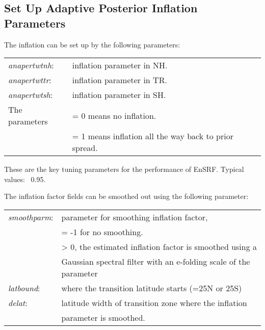 \subsection{Set Up Adaptive Posterior Inflation Parameters}

The inflation can be set up by the following parameters:

\begin{table}[htbp]
\centering
\begin{tabular}{ll}

\textit{anapertwtnh}:   & inflation parameter in NH. \\

\textit{anapertwttr}:   & inflation parameter in TR. \\

\textit{anapertwtsh}: & inflation parameter in SH. \\

The parameters &  = 0 means no inflation. \\
                           & = 1 means inflation all the way back to prior spread. \\

\end{tabular}
\end{table}
These are the key tuning parameters for the performance 
 of EnSRF. Typical values: ~0.95.


The inflation factor fields can be smoothed out using the following parameter:
\begin{table}[htbp]
\centering
\begin{tabular}{ll}

\textit{smoothparm}: & parameter for smoothing inflation factor, \\
&  = -1 for no smoothing.  \\
&  > 0, the estimated inflation factor is smoothed using a \\
&  Gaussian spectral filter with an e-folding scale of the parameter \\

\textit{latbound}: & where the transition latitude starts (=25N or 25S) \\

\textit{delat}: & latitude width of transition zone where the inflation \\
& parameter is smoothed. \\
           
\end{tabular}
\end{table}

